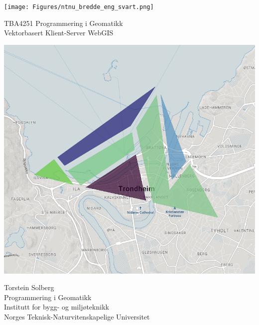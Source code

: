 \thispagestyle{empty}
\texttt{[image: Figures/ntnu\_bredde\_eng\_svart.png]}
\begin{center}
\vspace{2pc}
\Huge{TBA4251 Programmering i Geomatikk \\ Vektorbasert Klient-Server WebGIS }
\vspace{4pc}

    \includegraphics[scale=0.5]{Figures/forside.png}

\vspace{4pc}
\end{center}

Torstein Solberg\\
Programmering i Geomatikk\\
Institutt for bygg- og miljøteknikk\\
Norges Teknisk-Naturvitenskapelige Universitet






